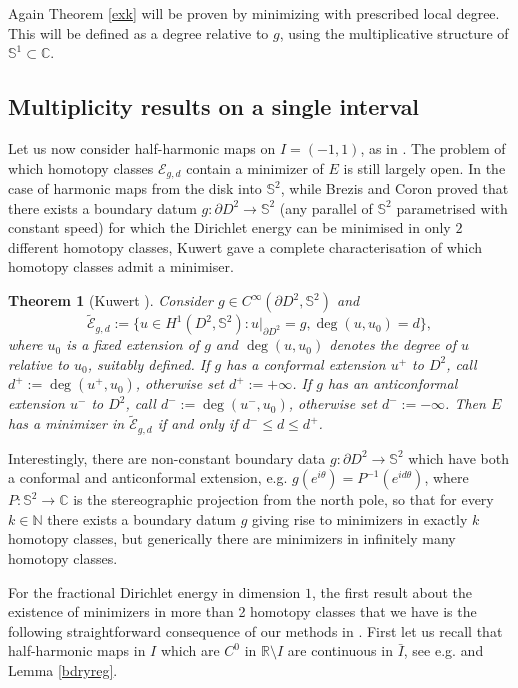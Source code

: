 \documentclass[12pt, a4paper]{article}
\newtheorem{thmx}{Theorem}
\newcommand{\M}[1]{\mathcal{#1}}
\newcommand{\sph}{\mathbb{S}}
\newcommand{\R}{\mathbb{R}}
\renewcommand{\(}{\left(}
\renewcommand{\)}{\right)}
\begin{document}
Again Theorem \ref{exk} will be proven by minimizing with prescribed local degree. This will be defined as a degree relative to $g$, using the multiplicative structure of $\sph^1\subset\mathbb{C}$.


\subsection{Multiplicity results on a single interval}

Let us now consider half-harmonic maps on $I=(-1,1)$, as in \cite{HM}.
The problem of which homotopy classes $\M{E}_{g,d}$ contain a minimizer of $E$ is still largely open. In the case of harmonic maps from the disk into $\sph^2$, while Brezis and Coron \cite{bc} proved that there exists a boundary datum $g:\partial D^2\to \sph^2$ (any parallel of $\sph^2$ parametrised with constant speed) for which the Dirichlet energy can be minimised in only $2$ different homotopy classes,  Kuwert gave a complete characterisation of which homotopy classes admit a minimiser.

\begin{thmx}[Kuwert \cite{kuw}]\label{thmkuw} Consider $g\in C^\infty(\partial D^2,\sph^2)$ and
$$\tilde{\mathcal{E}}_{g,d}:=\{u\in H^{1}(D^2,\sph^2):u|_{\partial D^2}=g,\deg(u,u_0)=d\},$$
where $u_0$ is a fixed extension of $g$ {and $\deg(u,u_0)$ denotes the degree of $u$ relative to $u_0$, suitably defined}. If $g$ has a conformal extension $u^+$ to $D^2$, call $d^+:=\deg(u^+,u_0)$, otherwise set $d^+:=+\infty$. If $g$ has an anticonformal extension $u^-$ to $D^2$, call $d^-:=\deg(u^-,u_0)$, otherwise set $d^-:=-\infty$. Then $E$ has a minimizer in $\tilde{\mathcal{E}}_{g,d}$ if and only if $d^-\le d\le d^+$.
\end{thmx}

Interestingly, there are non-constant boundary data $g:\partial D^2\to \sph^2$ which have both a conformal and anticonformal extension, e.g. $g(e^{i\theta})=P^{-1}(e^{i d\theta})$, where $P:\sph^2 \to \mathbb{C}$ is the stereographic projection from the north pole, so that for every $k\in \mathbb{N}$ there exists a boundary datum $g$ giving rise to minimizers in exactly $k$ homotopy classes, but generically there are minimizers in infinitely many homotopy classes.

\medskip

For the fractional Dirichlet energy in dimension $1$, the first result about the existence of minimizers in more than 2 homotopy classes that we have is the following straightforward consequence of our methods in \cite{HM}. First let us recall that half-harmonic maps in $I$ which are $C^0$ in $\R\setminus I$ are continuous in $\bar I$, see e.g. \cite{Sch} and Lemma \ref{bdryreg}.
 
\end{document}
